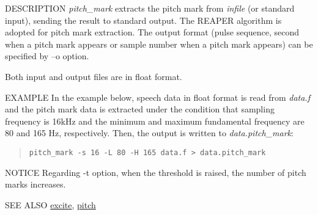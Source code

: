\begin{synopsis}
 \item[pitch\_mark] [ --s $S$ ] [ --t $T$ ] [ --L $Lo$ ] [ --H $Hi$ ] [ --o $O$ ][ {\em infile} ]
\end{synopsis}

\begin{qsection}{DESCRIPTION}
{\em pitch\_mark} extracts the pitch mark from {\em infile} (or standard input),
sending the result to standard output.
The REAPER \cite{ref:pitch-REAPER} algorithm is adopted for pitch mark extraction.
The output format (pulse sequence, second when a pitch mark appears or sample number when a pitch mark appears) can be specified by --o option.

Both input and output files are in float format.

\end{qsection}

\begin{options}
\end{options}

\begin{qsection}{EXAMPLE}
 In the example below, speech data in float format
 is read from {\em data.f} and the pitch mark data is extracted
 under the condition that sampling frequency is 16kHz
 and the minimum and maximum fundamental frequency are
 80 and 165 Hz, respectively.
 Then, the output is written to {\em data.pitch\_mark}:
 \begin{quote}
  \verb!pitch_mark -s 16 -L 80 -H 165 data.f > data.pitch_mark!
 \end{quote}
\end{qsection}

\begin{qsection}{NOTICE}
Regarding -t option, when the threshold is raised, the number of pitch marks increases.
\end{qsection}

\begin{qsection}{SEE ALSO}
\hyperlink{excite}{excite},
\hyperlink{pitch}{pitch}
\end{qsection}
